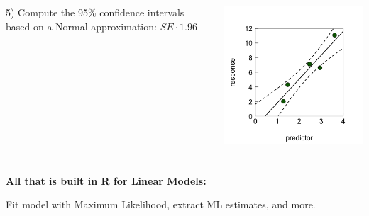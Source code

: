 \documentclass{beamer}
\begin{document}
\begin{frame}
    \frametitle{}
    \begin{columns}
        \begin{column}{0.5\textwidth}
        5) Compute the 95\% confidence intervals based on a Normal approximation: $SE \cdot 1.96$   
        \scalebox{0.7}{
            
        }
        \end{column}
        \begin{column}{0.5\textwidth}
        \includegraphics[width=\textwidth]{lectures/day_2_LM_refresh_I/figures/unnamed-chunk-35-1.png}    
        \end{column}
    \end{columns}


    
    
\end{frame}

\begin{frame}
    \frametitle{}
    \textbf{All that is built in R for Linear Models:}
    
    Fit model with Maximum Likelihood, extract ML estimates, and more.

    \scalebox{0.6}{
        
    }
    
\end{frame}
\end{document}
